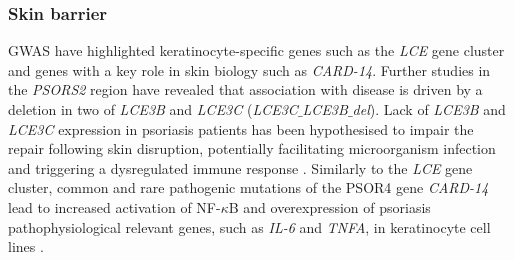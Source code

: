 \subsubsection*{Skin barrier}

GWAS have highlighted keratinocyte-specific genes such as the \textit{LCE} gene cluster and genes with a key role in skin biology such as \textit{CARD-14}. Further studies in the \textit{PSORS2} region have revealed that association with disease is driven by a deletion in two of \textit{LCE3B} and \textit{LCE3C} (\textit{LCE3C$\_ $LCE3B$\_ $del})\parencite{Cid2009}. Lack of \textit{LCE3B} and \textit{LCE3C} expression in psoriasis patients has been hypothesised to impair the repair following skin disruption, potentially facilitating microorganism infection and triggering a dysregulated immune response \parencite{Bergboer2011}. Similarly to the \textit{LCE} gene cluster, common and rare pathogenic mutations of the PSOR4 gene \textit{CARD-14} lead to increased activation of NF-$\kappa$B and overexpression of psoriasis pathophysiological relevant genes,  such as  \textit{IL-6} and \textit{TNFA}, in keratinocyte cell lines \parencite{Jordan2012}.







